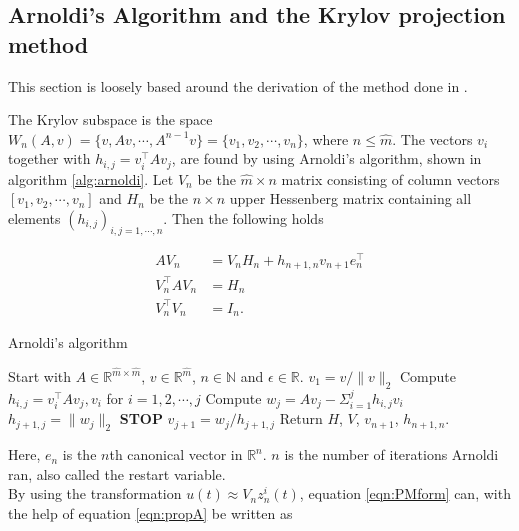 \subsection{Arnoldi's Algorithm and the Krylov projection method}
This section is loosely based around the derivation of the method done in \cite{!!!!!!referer!!!!!!!!!}.

The Krylov subspace is the space $W_n (A,v) = \{v,Av, \cdots, A^{n-1}v\} = \{v_1,v_2,\cdots,v_n\} $, where $n \leq \hat{m}$.
The vectors $v_i$ together with $h_{i,j} = v_i^\top Av_j$, are found by using Arnoldi's algorithm, shown in algorithm \ref{alg:arnoldi}. Let $V_n$ be the $\hat{m} \times n$ matrix consisting of column vectors $[v_1,v_2,\cdots,v_n ] $ and $H_n$ be the $n \times n$ upper Hessenberg matrix containing all elements $(h_{i,j})_{i,j=1,\cdots,n}$. Then the following holds \cite{kryprop}

\begin{equation}
\begin{aligned}
AV_n & = V_n H_n + h_{n+1,n}v_{n+1}e^\top_n  \\
V^{\top}_n AV_n &= H_n  \\
V_n^{\top} V_n &= I_n. 
\label{eqn:propA}
\end{aligned}
\end{equation}

\begin{algorithm} [h!]
\begin{algorithmic} \caption{Arnoldi's algorithm\cite{arnold}} \label{alg:arnoldi}  
\STATE Start with $A \in \mathbb{R}^{\hat{m} \times \hat{m}}$, $v \in \mathbb{R}^{\hat{m}}$, $n \in \mathbb{N}$ and $\epsilon \in \mathbb{R}$.
\STATE $v_1 = v/\|v \|_2$
   \STATE Compute $h_{i,j} =  v_i^{\top}Av_j,v_i $ for $i = 1,2,\cdots, j$
    \STATE Compute $w_j = A v_j - \Sigma_{i=1}^{j} h_{i,j}v_i $
    \STATE $h_{j+1,j} = \| w_j \|_2$
        \STATE\textbf{STOP}
    \ENDIF 
   \STATE $v_{j+1} = w_j/h_{j+1,j}$
\ENDFOR
\STATE Return $H$, $V$, $v_{n+1}$, $h_{n+1,n}$.
\end{algorithmic} 
\end{algorithm}



Here, $e_n$ is the $n$th canonical vector in $\mathbb{R}^n$. $n$ is the number of iterations Arnoldi ran, also called the restart variable.\\

By using the transformation $u(t) \approx V_n z_n^i(t)$, equation \eqref{eqn:PMform} can, with the help of equation \eqref{eqn:propA} be written as

